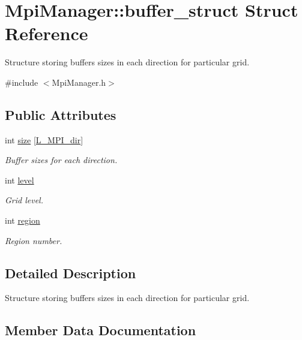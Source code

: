 \hypertarget{struct_mpi_manager_1_1buffer__struct}{}\section{Mpi\+Manager\+:\+:buffer\+\_\+struct Struct Reference}
\label{struct_mpi_manager_1_1buffer__struct}


Structure storing buffers sizes in each direction for particular grid.  




{\ttfamily \#include $<$Mpi\+Manager.\+h$>$}

\subsection*{Public Attributes}
\begin{DoxyCompactItemize}
\item 
int \hyperlink{struct_mpi_manager_1_1buffer__struct_aea0037fce808f601ae9c1e48926dbd0e}{size} \mbox{[}\hyperlink{definitions_8h_a3310be18f0cfda9ca2a17c51518a97e9}{L\+\_\+\+M\+P\+I\+\_\+dir}\mbox{]}
\begin{DoxyCompactList}\small\item\em Buffer sizes for each direction. \end{DoxyCompactList}\item 
int \hyperlink{struct_mpi_manager_1_1buffer__struct_adc6bb3b15665e3fb5834e6134395e1f9}{level}
\begin{DoxyCompactList}\small\item\em Grid level. \end{DoxyCompactList}\item 
int \hyperlink{struct_mpi_manager_1_1buffer__struct_a81730a85a03630880e8c378fcb8d3298}{region}
\begin{DoxyCompactList}\small\item\em Region number. \end{DoxyCompactList}\end{DoxyCompactItemize}


\subsection{Detailed Description}
Structure storing buffers sizes in each direction for particular grid. 

\subsection{Member Data Documentation}
